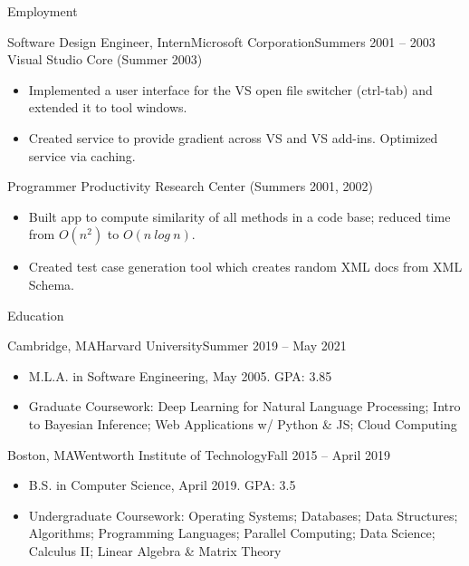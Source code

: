 \documentclass[]{mcdowellcv}
\begin{document}
\begin{cvsection}{Employment}
		\begin{cvsubsection}{Software Design Engineer, Intern}{Microsoft Corporation}{Summers 2001 -- 2003}
			Visual Studio Core (Summer 2003)		
			\begin{itemize}
				\item Implemented a user interface for the VS open file switcher (ctrl-tab) and extended it to tool windows.
				\item Created service to provide gradient across VS and VS add-ins. Optimized service via caching.
			\end{itemize}
			Programmer Productivity Research Center (Summers 2001, 2002)
			\begin{itemize}
				\item Built app to compute similarity of all methods in a code base; reduced time from $O(n^2)$ to $O(n\ log\ n)$. 
				\item Created test case generation tool which creates random XML docs from XML Schema.
			\end{itemize}
		\end{cvsubsection}
	\end{cvsection}
	
	\begin{cvsection}{Education}
		\begin{cvsubsection}{Cambridge, MA}{Harvard University}{Summer 2019 -- May 2021}
			\begin{itemize}
				\item M.L.A. in Software Engineering, May 2005. GPA: 3.85
				\item Graduate Coursework: Deep Learning for Natural Language Processing; Intro to Bayesian Inference; Web Applications w/ Python \& JS; Cloud Computing
				\end{itemize}
		\end{cvsubsection}
		\begin{cvsubsection}{Boston, MA}{Wentworth Institute of Technology}{Fall 2015 -- April 2019}
			\begin{itemize}
				\item B.S. in Computer Science, April 2019. GPA: 3.5
				\item Undergraduate Coursework: Operating Systems; Databases; Data Structures; Algorithms; Programming Languages; Parallel Computing; Data Science; Calculus II; Linear Algebra \& Matrix Theory
			\end{itemize}
		\end{cvsubsection}
	\end{cvsection}
	
\end{document}
